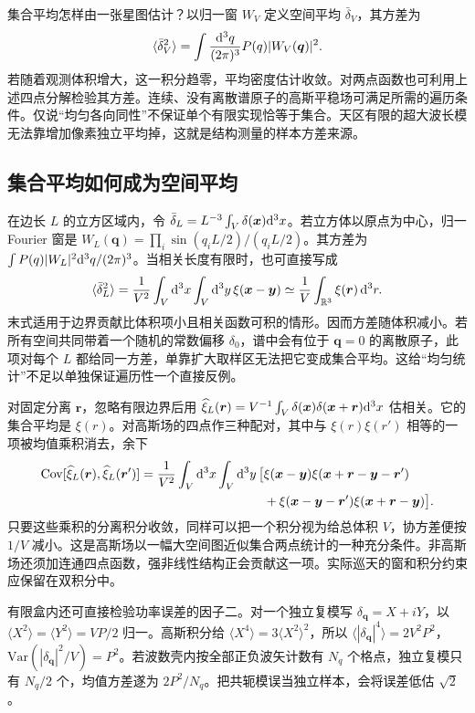 集合平均怎样由一张星图估计？以归一窗 $W_V$ 定义空间平均 $\bar\delta_V$，其方差为
\[
 \langle\bar\delta_V^2\rangle
       =\int\frac{\dd^3q}{(2\pi)^3}P(q)|W_V(\bm q)|^2 .
\]
若随着观测体积增大，这一积分趋零，平均密度估计收敛。对两点函数也可利用上述四点分解检验其方差。连续、没有离散谱原子的高斯平稳场可满足所需的遍历条件。仅说“均匀各向同性”不保证单个有限实现恰等于集合。天区有限的超大波长模无法靠增加像素独立平均掉，这就是结构测量的样本方差来源。

\subsection{集合平均如何成为空间平均}

在边长 $L$ 的立方区域内，令 $\bar\delta_L=L^{-3}\int_V\delta(\bm x)\dd^3x$。若立方体以原点为中心，归一 Fourier 窗是 $W_L(\bm q)=\prod_i\sin(q_iL/2)/(q_iL/2)$。其方差为 $\int P(q)|W_L|^2\dd^3q/(2\pi)^3$。当相关长度有限时，也可直接写成
\[
 \langle\bar\delta_L^2\rangle
  =\frac1{V^2}\int_V\dd^3x\int_V\dd^3y\,\xi(\bm x-\bm y)
  \simeq\frac1V\int_{\mathbb R^3}\xi(\bm r)\,\dd^3r .
\]
末式适用于边界贡献比体积项小且相关函数可积的情形。因而方差随体积减小。若所有空间共同带着一个随机的常数偏移 $\delta_0$，谱中会有位于 $\bm q=0$ 的离散原子，此项对每个 $L$ 都给同一方差，单靠扩大取样区无法把它变成集合平均。这给“均匀统计”不足以单独保证遍历性一个直接反例。

对固定分离 $\bm r$，忽略有限边界后用 $\widehat\xi_L(\bm r)=V^{-1}\int_V\delta(\bm x)\delta(\bm x+\bm r)\dd^3x$ 估相关。它的集合平均是 $\xi(r)$。对高斯场的四点作三种配对，其中与 $\xi(r)\xi(r')$ 相等的一项被均值乘积消去，余下
\[
 \begin{split}
 {\rm Cov}[\widehat\xi_L(\bm r),\widehat\xi_L(\bm r')]
 =\frac1{V^2}\int_V\dd^3x\int_V\dd^3y\,
 \big[&\xi(\bm x-\bm y)\xi(\bm x+\bm r-\bm y-\bm r')\\
 &+\xi(\bm x-\bm y-\bm r')\xi(\bm x+\bm r-\bm y)\big].
 \end{split}
\]
只要这些乘积的分离积分收敛，同样可以把一个积分视为给总体积 $V$，协方差便按 $1/V$ 减小。这是高斯场以一幅大空间图近似集合两点统计的一种充分条件。非高斯场还须加连通四点函数，强非线性结构正会贡献这一项。实际巡天的窗和积分约束应保留在双积分中。

有限盒内还可直接检验功率误差的因子二。对一个独立复模写 $\delta_{\bm q}=X+iY$，以 $\langle X^2\rangle=\langle Y^2\rangle=VP/2$ 归一。高斯积分给 $\langle X^4\rangle=3\langle X^2\rangle^2$，所以 $\langle|\delta_{\bm q}|^4\rangle=2V^2P^2$，$\mathrm{Var}(|\delta_{\bm q}|^2/V)=P^2$。若波数壳内按全部正负波矢计数有 $N_q$ 个格点，独立复模只有 $N_q/2$ 个，均值方差遂为 $2P^2/N_q$。把共轭模误当独立样本，会将误差低估 $\sqrt2$。

